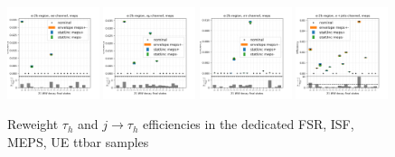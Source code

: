 \begin{figure}
    \includegraphics[width=0.24\textwidth]{appendices/ttSystReweighting/figures/afterCorr/icata3_ch0_meps.png}
    \includegraphics[width=0.24\textwidth]{appendices/ttSystReweighting/figures/afterCorr/icata3_ch1_meps.png}
    \includegraphics[width=0.24\textwidth]{appendices/ttSystReweighting/figures/afterCorr/icata3_ch2_meps.png}
    \includegraphics[width=0.24\textwidth]{appendices/ttSystReweighting/figures/afterCorr/icata3_ch3_meps.png}
    
    \caption{Reweight $\tau_h$ and $j \to \tau_h$ efficiencies in the dedicated FSR, ISF, MEPS, UE ttbar samples}
    \label{fig:appendix:reweighttt:effAfterCorrFSR}
\end{figure}


